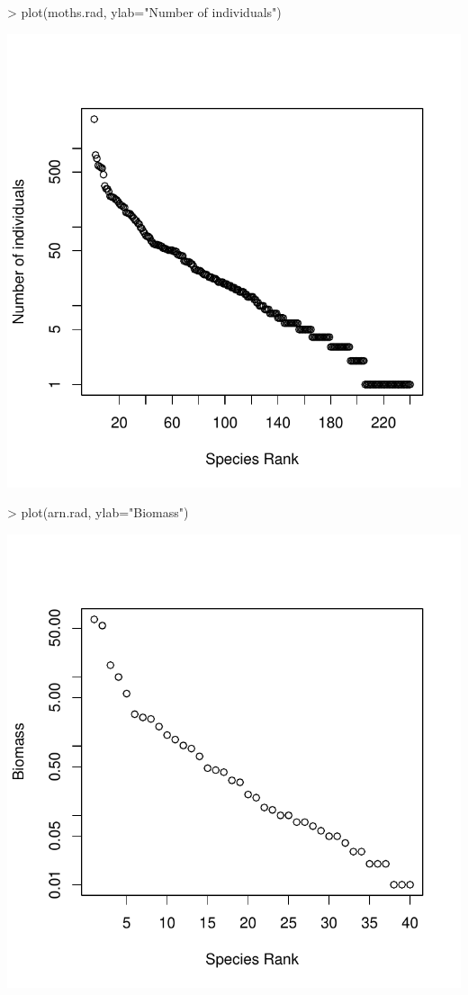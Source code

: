 \documentclass[11pt, A4]{article}
\begin{document}
{\centering %
\begin{Schunk}
\begin{Sinput}
> plot(moths.rad, ylab="Number of individuals")
\end{Sinput}
\end{Schunk}
\includegraphics{sads_intro-woven-radplot1}
}

{\centering
\begin{Schunk}
\begin{Sinput}
> plot(arn.rad, ylab="Biomass")
\end{Sinput}
\end{Schunk}
\includegraphics{sads_intro-woven-radplots}
}
\end{document}
